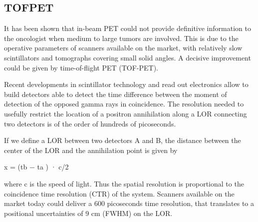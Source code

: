 \subsection{TOFPET}

It has been shown that in-beam PET could not provide definitive information to the oncologist when medium to large tumors are involved\cite{Fiedler2006}. This is due to the operative parameters of scanners available on the market, with relatively slow scintillators and tomographs covering small solid angles. A decisive improvement could be given by time-of-flight PET (TOF-PET).

Recent developments in scintillator technology and read out electronics allow to build detectors able to detect the time difference between the moment of detection of the opposed gamma rays in coincidence. The resolution needed to usefully restrict the location of a positron annihilation along a LOR connecting two detectors is of the order of hundreds of picoseconds.

If we define a LOR between two detectors A and B, the distance between the center of the LOR and the annihilation point is given by

x = (tb − ta ) · c/2

where c is the speed of light.
Thus the spatial resolution is proportional to the coincidence time resolution (CTR) of the system.
Scanners available on the market today could deliver a 600 picoseconds time resolution, that translates to a positional uncertainties of 9 cm (FWHM) on the LOR.


